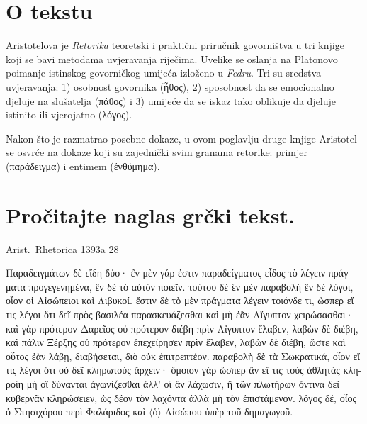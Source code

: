 

\section*{O tekstu}

Aristotelova je \textit{Retorika} teoretski i praktični priručnik govorništva u tri knjige koji se bavi metodama uvjeravanja riječima. Uvelike se oslanja na Platonovo poimanje istinskog govorničkog umijeća izloženo u \textit{Fedru}. Tri su sredstva uvjeravanja: 1) osobnost govornika \textgreek[variant=ancient]{(ἦθος),} 2) sposobnost da se emocionalno djeluje na slušatelja \textgreek[variant=ancient]{(πάθος)} i 3) umijeće da se iskaz tako oblikuje da djeluje istinito ili vjerojatno \textgreek[variant=ancient]{(λόγος).}

Nakon što je razmatrao posebne dokaze, u ovom poglavlju druge knjige Aristotel se osvrće na dokaze koji su zajednički svim granama retorike: primjer \textgreek[variant=ancient]{(παράδειγμα)} i entimem \textgreek[variant=ancient]{(ἐνθύμημα).}

\section*{Pročitajte naglas grčki tekst.}

Arist.\ Rhetorica 1393a 28


\medskip

\begin{greek}
{\large
{ \noindent Παραδειγμάτων δὲ εἴδη δύο· ἓν μὲν γάρ ἐστιν παραδείγματος εἶδος τὸ λέγειν πράγματα προγεγενημένα, ἓν δὲ τὸ αὐτὸν ποιεῖν. τούτου δὲ ἓν μὲν παραβολὴ ἓν δὲ λόγοι, οἷον οἱ Αἰσώπειοι καὶ Λιβυκοί. ἔστιν δὲ τὸ μὲν πράγματα λέγειν τοιόνδε τι, ὥσπερ εἴ τις λέγοι ὅτι δεῖ πρὸς βασιλέα παρασκευάζεσθαι καὶ μὴ ἐᾶν Αἴγυπτον χειρώσασθαι· καὶ γὰρ πρότερον Δαρεῖος οὐ πρότερον διέβη πρὶν Αἴγυπτον ἔλαβεν, λαβὼν δὲ διέβη, καὶ πάλιν Ξέρξης οὐ πρότερον ἐπεχείρησεν πρὶν ἔλαβεν, λαβὼν δὲ διέβη, ὥστε καὶ οὗτος ἐὰν λάβῃ, διαβήσεται, διὸ οὐκ ἐπιτρεπτέον. παραβολὴ δὲ τὰ Σωκρατικά, οἷον εἴ τις λέγοι ὅτι οὐ δεῖ κληρωτοὺς ἄρχειν· ὅμοιον γὰρ ὥσπερ ἂν εἴ τις τοὺς ἀθλητὰς κληροίη μὴ οἳ δύνανται ἀγωνίζεσθαι ἀλλ' οἳ ἂν λάχωσιν, ἢ τῶν πλωτήρων ὅντινα δεῖ κυβερνᾶν κληρώσειεν, ὡς δέον τὸν λαχόντα ἀλλὰ μὴ τὸν ἐπιστάμενον. λόγος δέ, οἷος ὁ Στησιχόρου περὶ Φαλάριδος καὶ $\langle$ὁ$\rangle$ Αἰσώπου ὑπὲρ τοῦ δημαγωγοῦ.

}
}
\end{greek}
